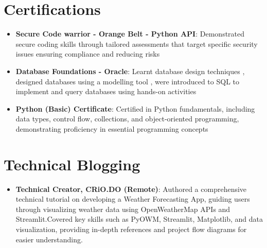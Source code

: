 \documentclass[letterpaper,11pt]{article}
\newcommand{\resumeItem}[2]{
  \item\small{
    \textbf{#1}{: #2 \vspace{-2pt}}
  }
}
\newcommand{\resumeSubItem}[2]{\resumeItem{#1}{#2}\vspace{-4pt}}
\newcommand{\resumeSubHeadingListStart}{\begin{itemize}[leftmargin=*]}
\newcommand{\resumeSubHeadingListEnd}{\end{itemize}}
\begin{document}
  



\section{Certifications}
  \resumeSubHeadingListStart
    \resumeSubItem{Secure Code warrior - Orange Belt - Python API}{Demonstrated secure coding skills through tailored assessments that target specific security issues ensuring compliance and reducing risks}
    \resumeSubItem{Database Foundations - Oracle}{Learnt database design techniques , designed databases using a modelling tool , were introduced to SQL to implement and query databases using hands-on activities}
    \resumeSubItem{Python (Basic) Certificate}{Certified in Python fundamentals, including data types, control flow, collections, and object-oriented programming, demonstrating proficiency in essential programming concepts}
  \resumeSubHeadingListEnd

\section{Technical Blogging}
  \resumeSubHeadingListStart
    \resumeSubItem{Technical Creator, CRiO.DO (Remote)}{Authored a comprehensive technical tutorial on developing a Weather Forecasting App, guiding users through visualizing weather data using OpenWeatherMap APIs and Streamlit.Covered key skills such as PyOWM, Streamlit, Matplotlib, and data visualization, providing in-depth references and project flow diagrams for easier understanding.}
    
  \resumeSubHeadingListEnd
\end{document}
